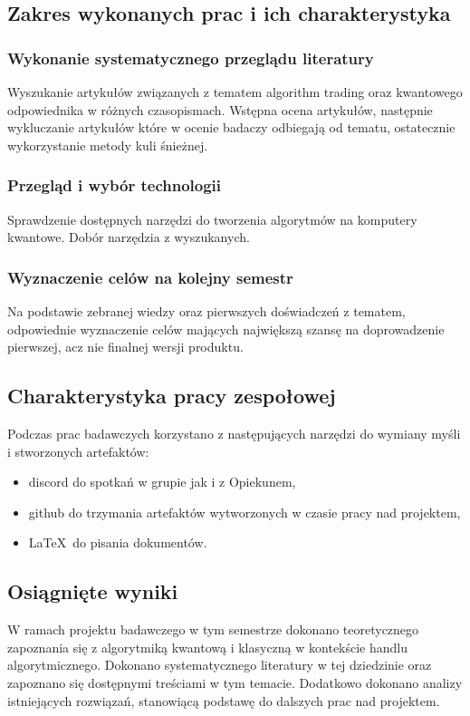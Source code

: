 \documentclass[polish,envcountsect,10pt]{article}
\begin{document}
\subsection{Zakres wykonanych prac i ich charakterystyka}

\subsubsection{Wykonanie systematycznego przeglądu literatury}
Wyszukanie artykułów związanych z tematem algorithm trading oraz kwantowego odpowiednika w różnych czasopismach. 
Wstępna ocena artykułów, następnie wykluczanie artykułów które w ocenie badaczy odbiegają od tematu, ostatecznie wykorzystanie metody kuli śnieżnej. 


\subsubsection{Przegląd i wybór technologii}
Sprawdzenie dostępnych narzędzi do tworzenia algorytmów na komputery kwantowe. Dobór narzędzia z wyszukanych.

\subsubsection{Wyznaczenie celów na kolejny semestr}
Na podstawie zebranej wiedzy oraz pierwszych doświadczeń z tematem, 
odpowiednie wyznaczenie celów mających największą szansę na doprowadzenie pierwszej, 
acz nie finalnej wersji produktu.

\subsection{Charakterystyka pracy zespołowej}
Podczas prac badawczych korzystano z następujących narzędzi do wymiany myśli i stworzonych artefaktów:
\begin{itemize}
	\item discord do spotkań w grupie jak i z Opiekunem, 
	\item github do trzymania artefaktów wytworzonych w czasie pracy nad projektem,
	\item \LaTeX ~do pisania dokumentów.
\end{itemize}
\subsection{Osiągnięte wyniki}
W ramach projektu badawczego w tym semestrze dokonano teoretycznego zapoznania się z algorytmiką kwantową i klasyczną w kontekście handlu algorytmicznego.
Dokonano systematycznego literatury w tej dziedzinie oraz zapoznano się dostępnymi treściami w tym temacie. 
Dodatkowo dokonano analizy istniejących rozwiązań, stanowiącą podstawę do dalszych prac nad projektem.
\end{document}
